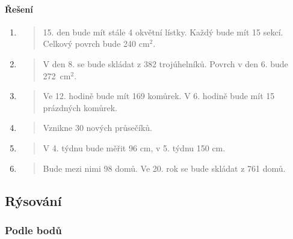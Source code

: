 \newpage

\paragraph{Řešení}
\begin{enumerate}
    \item
    \begin{quote}
        15. den bude mít stále 4 okvětní lístky. Každý bude mít 15 sekcí. Celkový povrch bude 240 cm$^{2}$.
    \end{quote}

    \item
    \begin{quote}
        V den 8. se bude skládat z 382 trojúhelníků. Povrch v den 6. bude 272~cm$^{2}$.
    \end{quote}

    \item
    \begin{quote}
        Ve 12. hodině bude mít 169 komůrek. V 6. hodině bude mít 15 prázdných komůrek.
    \end{quote}

    \item
    \begin{quote}
        Vznikne 30 nových průsečíků.
    \end{quote}

    \item
    \begin{quote}
        V 4. týdnu bude měřit 96 cm, v 5. týdnu 150 cm.
    \end{quote}

    \item
    \begin{quote}
        Bude mezi nimi 98 domů. Ve 20. rok se bude skládat z 761 domů.
    \end{quote}
\end{enumerate}

\newpage

\subsection{Rýsování}
\label{subsec:rysovani}

\subsubsection{Podle bodů}

